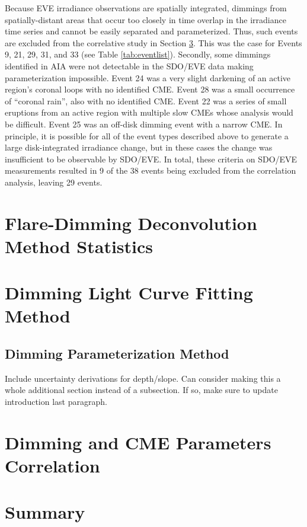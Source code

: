 Because EVE irradiance observations are spatially integrated, dimmings from spatially-distant areas that occur too closely in time overlap in the irradiance time series and cannot be easily separated and parameterized. Thus, such events are excluded from the correlative study in Section \ref{sec:correlation}. This was the case for Events 9, 21, 29, 31, and 33 (see Table \ref{tab:eventlist}). Secondly, some dimmings identified in AIA were not detectable in the SDO/EVE data making parameterization impossible. Event 24 was a very slight darkening of  an active region’s coronal loops with no identified CME. Event 28 was a small occurrence of “coronal rain”, also with no identified CME. Event 22 was a series of small eruptions from an active region with multiple slow CMEs whose analysis would be difficult. Event 25 was an off-disk dimming event with a narrow CME.  In principle, it is possible for all of the event types described above to generate a large disk-integrated irradiance change, but in these cases the change was insufficient to be observable by SDO/EVE. In total, these criteria on SDO/EVE measurements resulted in 9 of the 38 events being excluded from the correlation analysis, leaving 29 events.




\section{Flare-Dimming Deconvolution Method Statistics}
\label{sec:deconvolutionstatistics}

\section{Dimming Light Curve Fitting Method}
\label{sec:fittingmethod}

\subsection{Dimming Parameterization Method}
Include uncertainty derivations for depth/slope. Can consider making this a whole additional section instead of a subsection. If so, make sure to update introduction last paragraph. 

\section{Dimming and CME Parameters Correlation}
\label{sec:correlation}

\section{Summary} 
\label{sec:chapter5summary}








